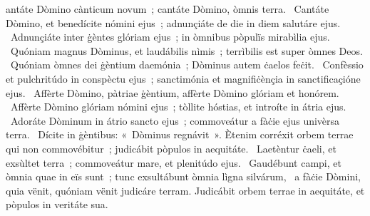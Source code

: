 \psalmChapterWithInscription{}
{ }
{%
antáte Dòmino cànticum novum~; cantáte Dòmino, òmnis terra. 
~Cantáte Dòmino, et benedícite nómini ejus~; adnunçiáte de die in diem salutáre ejus. 
~Adnunçiáte inter ġèntes glóriam ejus~; in òmnibus pòpulïs mirabìlia ejus. 
~Quóniam magnus Dòminus, et laudábilis nìmis~; terrìbilis est super òmnes Deos. 
~Quóniam òmnes dei ġèntium daemónia~; Dòminus autem ċaelos feċit. 
~Confèssio et pulchritúdo in conspèctu ejus~; sanctimónia et magnifiċènçia in sanctificaçióne ejus. 
~Affèrte Dòmino, pàtriae ġèntium, affèrte Dòmino glóriam et honórem. 
~Affèrte Dòmino glóriam nómini ejus~; tòllite hóstias, et introíte in átria ejus. 
~Adoráte Dòminum in átrio sancto ejus~; commoveátur a fàċie ejus univèrsa terra. 
~Dícite in ġèntibus: «~Dòminus regnávit~». Ètenim corréxit orbem terrae qui non commovébitur~; judicábit pòpulos in aequitáte. 
~Laetèntur ċaeli, et exsùltet terra~; commoveátur mare, et plenitúdo ejus. 
~Gaudébunt campi, et òmnia quae in eïs sunt~; tunc exsultábunt òmnia lìgna silvárum, 
~a fàċie Dòmini, quia vënit, quóniam vënit judicáre terram. Judicábit orbem terrae in aequitáte, et pòpulos in veritáte sua. 
}
